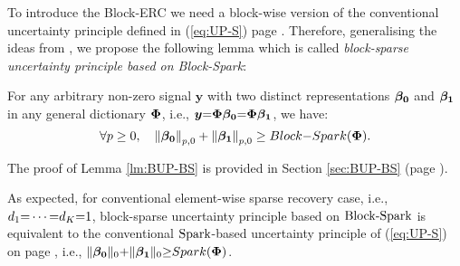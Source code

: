 To introduce the Block-ERC we need a block-wise version of the conventional uncertainty principle defined in (\ref{eq:UP-S}) page \pageref{eq:UP-S}.
Therefore, generalising the ideas from \cite{Gorodnitsky1997,Donoho1989,Donoho2001,Elad2001,Elad2002a,Donoho2003,Donoho2003a,Gribonval2003a,Gribonval2003,Bruckstein2009}, we propose the following lemma which is called \emph{block-sparse uncertainty principle based on Block-Spark}:
\begin{lemma}
\label{lm:BUP-BS}
For any arbitrary non-zero signal $\boldsymbol{y}$ with two distinct representations $\boldsymbol{\beta_0}$ and $\boldsymbol{\beta_1}$ in any general dictionary $\boldsymbol{\Phi}$, i.e., $\boldsymbol{y} {=} \boldsymbol{\Phi}\boldsymbol{\beta_0} {=} \boldsymbol{\Phi}\boldsymbol{\beta_1}$, we have:
\begin{equation*}
\forall p \geq 0, \quad \left\lVert\boldsymbol{\beta_0}\right\rVert_{p,0}+ \left\lVert\boldsymbol{\beta_1}\right\rVert_{p,0} \geq Block{-}Spark(\boldsymbol{\Phi}).
\end{equation*}
\end{lemma}
The proof of Lemma \ref{lm:BUP-BS} is provided in Section \ref{sec:BUP-BS} (page \pageref{sec:BUP-BS}).

As expected, for conventional element-wise sparse recovery case, i.e., $d_1 {=} \cdots {=} d_K {=} 1$, block-sparse uncertainty principle based on $\mathrm{Block\text{{-}}Spark}$ is equivalent to the conventional $\mathrm{Spark}$-based uncertainty principle of (\ref{eq:UP-S}) on page \pageref{eq:UP-S}, i.e., $\Vert \boldsymbol{\beta_0} \Vert_0 {+} \Vert \boldsymbol{\beta_1} \Vert_0 {\geq} Spark(\boldsymbol{\Phi})$.